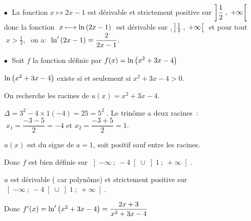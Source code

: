 \begin{example}
\begin{itemize}
\item[$ \bullet \;$]  La fonction $ x\longmapsto 2x-1 $  est dérivable et strictement positive sur 
$ \left]\dfrac{1}{2} \;,\; +\infty\right[ \; $ donc la fonction $\;  x\longmapsto \ln \left(2x-1 \right)\; $ est dérivable sur $_; \left]\frac{1}{2} \;,\; +\infty\right[ \;$ et pour tout $\;  x> \frac{1}{2},\; $ on a: $\;   \ln^{\prime} \left(2x-1 \right) =\dfrac{2}{2x-1} $.

\item[$ \bullet \;$] Soit $ f $ la fonction  définie par $ f(x)= \ln \left({x^2} + 3x - 4 \right) $

$\ln \left({x^2} + 3x - 4 \right)$ existe  si et seulement si
    ${x^2} + 3x - 4 > 0$.

    On recherche les racines de $u\left( x \right) = {x^2} + 3x - 4$.

    $\Delta = {3^2} - 4 \times 1\left( { - 4} \right) = 25 =
    {5^2}\; $. 
  Le trin\^{o}me a deux racines~: 
  $\;{x_1} = \dfrac{{ - 3 - 5}}{2} = - 4{\text{ et }}{x_2} = \dfrac{{
        - 3 + 5}}{2} = 1$.
        
        $u\left( x \right)$ est du signe de $a = 1$, soit positif sauf
    entre les racines.
    
    Donc $f$ est bien définie sur $\left] {-\infty\ ;\ - 4} \right[
    \cup \left] {1\ ;\ + \infty } \right[$.
    
    $ u $   est dérivable ( car polynôme) et   strictement positive sur $\left] {-\infty\ ;\ - 4} \right[
    \cup \left] {1\ ;\ + \infty } \right[$.
    
Donc    $ f^{\prime}(x)=\ln^{\prime} \left({x^2} + 3x - 4 \right) =\dfrac{2x+3}{{x^2} + 3x - 4}$

 \end{itemize}
\end{example}

